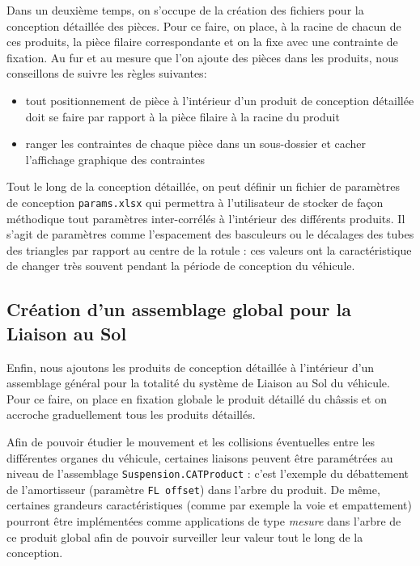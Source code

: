 \par Dans un deuxième temps, on s'occupe de la création des fichiers pour la conception détaillée des pièces. Pour ce faire, on place, à la racine de chacun de ces produits, la pièce filaire correspondante et on la fixe avec une contrainte de fixation. Au fur et au mesure que l'on ajoute des pièces dans les produits, nous conseillons de suivre les règles suivantes:
\begin{itemize}
    \item tout positionnement de pièce à l'intérieur d'un produit de conception détaillée doit se faire par rapport à la pièce filaire à la racine du produit
    \item ranger les contraintes de chaque pièce dans un sous-dossier et cacher l'affichage graphique des contraintes 
\end{itemize}{}
\par Tout le long de la conception détaillée, on peut définir un fichier de paramètres de conception \texttt{params.xlsx} qui permettra à l'utilisateur de stocker de façon méthodique tout paramètres inter-corrélés à l'intérieur des différents produits. Il s'agit de paramètres comme l'espacement des basculeurs ou le décalages des tubes des triangles par rapport au centre de la rotule : ces valeurs ont la caractéristique de changer très souvent pendant la période de conception du véhicule.

\subsection{Création d'un assemblage global pour la Liaison au Sol} %

\par Enfin, nous ajoutons les produits de conception détaillée à l'intérieur d'un assemblage général pour la totalité du système de Liaison au Sol du véhicule. Pour ce faire, on place en fixation globale le produit détaillé du châssis et on accroche graduellement tous les produits détaillés.

\par Afin de pouvoir étudier le mouvement et les collisions éventuelles entre les différentes organes du véhicule, certaines  liaisons peuvent être paramétrées au niveau de l'assemblage \texttt{Suspension.CATProduct} : c'est l'exemple du débattement de l'amortisseur (paramètre \texttt{FL offset}) dans l'arbre du produit.
De même, certaines grandeurs caractéristiques (comme par exemple la voie et empattement) pourront être implémentées comme applications de type \textit{mesure} dans l'arbre de ce produit global afin de pouvoir surveiller leur valeur tout le long de la conception. 
